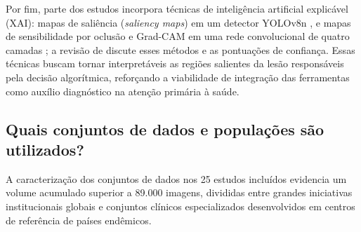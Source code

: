 Por fim, parte dos estudos incorpora técnicas de inteligência artificial explicável (XAI):
mapas de saliência (\textit{saliency maps}) em um detector YOLOv8n , e mapas de
sensibilidade por oclusão e Grad-CAM em uma rede convolucional de quatro camadas ;
a revisão de  discute esses métodos e as pontuações de confiança.
Essas técnicas buscam tornar
interpretáveis as regiões salientes da lesão responsáveis pela decisão algorítmica,
reforçando a viabilidade de integração das ferramentas como auxílio diagnóstico na
atenção primária à saúde.

\subsection{Quais conjuntos de dados e populações são utilizados?}
\label{subsec:rq2-datasets}

A caracterização dos conjuntos de dados nos 25 estudos incluídos evidencia um volume
acumulado superior a 89.000 imagens, divididas entre grandes iniciativas institucionais
globais e conjuntos clínicos especializados desenvolvidos em centros de referência
de países endêmicos.

